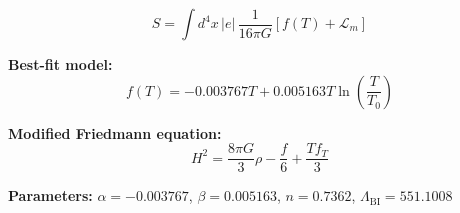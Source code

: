 
\begin{equation}
  S = \int d^4x \, |e| \, \frac{1}{16\pi G} \left[ f(T) + \mathcal{L}_m \right]
\end{equation}

\textbf{Best-fit model:}
\begin{equation}
  f(T) = -0.003767 T + 0.005163 T \ln\!\left(\frac{T}{T_0}\right)
\end{equation}

\textbf{Modified Friedmann equation:}
\begin{equation}
  H^2 = \frac{8\pi G}{3} \rho - \frac{f}{6} + \frac{T f_T}{3}
\end{equation}

\textbf{Parameters:}
$\alpha = -0.003767$, \quad
$\beta = 0.005163$, \quad
$n = 0.7362$, \quad
$\Lambda_{\text{BI}} = 551.1008$